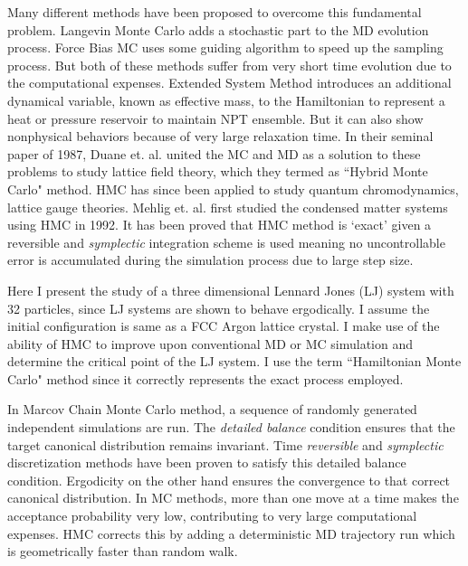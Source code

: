 \documentclass[aps,prl,reprint]{revtex4-1}
\begin{document}
Many different methods have been proposed to overcome this fundamental problem. Langevin Monte Carlo adds a stochastic part to the MD evolution process. Force Bias MC uses some guiding algorithm to speed up the sampling process. But both of these methods suffer from very short time evolution due to the computational expenses. Extended System Method introduces an additional dynamical variable, known as effective mass, to the Hamiltonian to represent a heat or pressure reservoir to maintain NPT ensemble. But it can also show nonphysical behaviors because of very large relaxation time.\cite{Cho1992} In their seminal paper of 1987, Duane et. al. united the MC and MD as a solution to these problems to study lattice field theory, which they termed as ``Hybrid Monte Carlo" method.\cite{Duane1987} HMC has since been applied to study quantum chromodynamics, lattice gauge theories. Mehlig et. al. first studied the condensed matter systems using HMC in 1992. It has been proved that HMC method is `exact' given a reversible and \textit{symplectic} integration scheme is used meaning no uncontrollable error is accumulated during the simulation process due to large step size. \cite{Mehlig1992}

Here I present the study of a three dimensional Lennard Jones (LJ) system with 32 particles, since LJ systems are shown to behave ergodically. \cite{Cho1992} I assume the initial configuration is same as a FCC Argon lattice crystal. I make use of the ability of HMC to improve upon conventional MD or MC simulation and determine the critical point of the LJ system. I use the term ``Hamiltonian Monte Carlo" method since it correctly represents the exact process employed.

In Marcov Chain Monte Carlo method, a sequence of randomly generated independent simulations are run. The \textit{detailed balance} condition ensures that the target canonical distribution remains invariant. \cite{Duane1987} Time \textit{reversible} and \textit{symplectic} discretization methods have been proven to satisfy this detailed balance condition. \cite{Mehlig1992} Ergodicity on the other hand ensures the convergence to that correct canonical distribution. \cite{Suwa2010} In MC methods, more than one move at a time makes the acceptance probability very low, contributing to very large computational expenses. HMC corrects this by adding a deterministic MD trajectory run which is geometrically faster than random walk.
\end{document}
